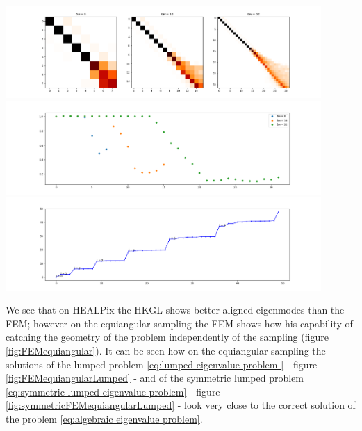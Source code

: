 \begin{minipage}[t!]{.49\textwidth}
	\raggedright
	\center
	\centering
	\includegraphics[width=0.9\textwidth]{../codes/03.FEM_laplacian/equiangular/mass_lumping/BLB/img/linearFEM.png}
	\includegraphics[width=0.9\textwidth]{../codes/03.FEM_laplacian/equiangular/mass_lumping/BLB/img/linearFEM_diagonal.png}	
	\includegraphics[width=0.9\textwidth]{../codes/03.FEM_laplacian/equiangular/mass_lumping/BLB/img/FEM_eigenvalues_32.png}	
\end{minipage}

We see that on HEALPix the HKGL shows better aligned eigenmodes than the FEM; however on the equiangular sampling the FEM shows how his capability of catching the geometry of the problem independently of the sampling (figure \ref{fig:FEMequiangular}). It can be seen how on the equiangular sampling the solutions of the lumped problem \ref{eq:lumped eigenvalue problem } - figure \ref{fig:FEMequiangularLumped} - and of the symmetric lumped problem \ref{eq:symmetric lumped eigenvalue problem} - figure \ref{fig:symmetricFEMequiangularLumped} - look very close to the correct solution of the problem \ref{eq:algebraic  eigenvalue problem}.



